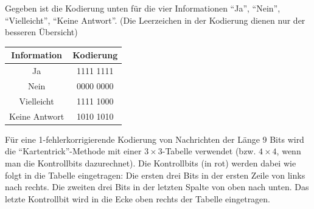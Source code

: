\begin{questions}
        Gegeben ist die Kodierung unten für die vier Informationen \enquote{Ja}, \enquote{Nein}, \enquote{Vielleicht}, \enquote{Keine Antwort}. (Die Leerzeichen in der Kodierung dienen nur der besseren Übersicht)

        \begin{table}[h!]
            \centering
            \begin{tabular}{c|c}
               Information &   Kodierung  \\ \midrule\midrule
               Ja &  1111 1111\\ \midrule
               Nein &  0000 0000\\  \midrule
               Vielleicht & 1111 1000  \\  \midrule
               Keine Antwort & 1010 1010  \\ 
            \end{tabular}
        \end{table}
        
        \clearpage
        \question
        Für eine 1-fehlerkorrigierende Kodierung von Nachrichten der Länge 9 Bits wird die \enquote{Kartentrick}-Methode mit einer $3\times3$-Tabelle verwendet (bzw. $4\times4$, wenn man die Kontrollbits dazurechnet). Die Kontrollbits (in rot) werden dabei wie folgt in die Tabelle eingetragen: Die ersten drei Bits in der ersten Zeile von links nach rechts. Die zweiten drei Bits in der letzten Spalte von oben nach unten. Das letzte Kontrollbit wird in die Ecke oben rechts der Tabelle eingetragen.


\end{questions}
